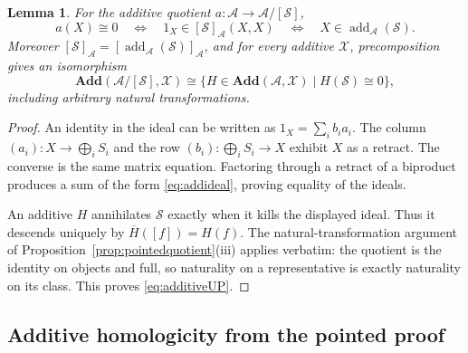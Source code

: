 \documentclass[11pt,reqno,a4paper]{amsart}
\newtheorem{lemma}[theorem]{Lemma}
\theoremstyle{definition}
\theoremstyle{remark}
\newcommand{\A}{\mathcal{A}}
\newcommand{\0}{\mathbf{0}}
\renewcommand{\1}{\mathbf{1}}
\newcommand{\iso}{\cong}
\newcommand{\Add}{\mathbf{Add}}
\newcommand{\Scl}{\mathcal S}
\newcommand{\X}{\mathcal X}
\newcommand{\aq}[2]{#1/[#2]}
\DeclareMathOperator{\add}{add}
\begin{document}
\begin{lemma}\label{lem:additivequotient}
For the additive quotient $a:\A\to\aq{\A}{\Scl}$,
\begin{equation}\label{eq:additivezero}
 a(X)\iso0\quad\Longleftrightarrow\quad
 1_X\in[\Scl]_{\A}(X,X)
 \quad\Longleftrightarrow\quad X\in\add_{\A}(\Scl).
\end{equation}
Moreover $[\Scl]_{\A}=[\add_{\A}(\Scl)]_{\A}$, and for every
additive $\X$, precomposition gives an isomorphism
\begin{equation}\label{eq:additiveUP}
 \Add(\aq{\A}{\Scl},\X)\iso
 \{H\in\Add(\A,\X)\mid H(\Scl)\iso0\},
\end{equation}
including arbitrary natural transformations.
\end{lemma}
\begin{proof}
An identity in the ideal can be written as $1_X=\sum_i b_i a_i$.
The column $(a_i):X\to\bigoplus_i S_i$ and the row
$(b_i):\bigoplus_i S_i\to X$ exhibit $X$ as a retract. The converse
is the same matrix equation. Factoring through a retract of a biproduct
produces a sum of the form \eqref{eq:addideal}, proving equality of the
ideals.

An additive $H$ annihilates $\Scl$ exactly when it kills the displayed
ideal. Thus it descends uniquely by $\overline H([f])=H(f)$.
The natural-transformation argument of
Proposition~\ref{prop:pointedquotient}(iii) applies verbatim: the quotient
is the identity on objects and full, so naturality on a representative
is exactly naturality on its class. This proves \eqref{eq:additiveUP}.
\end{proof}

\subsection{Additive homologicity from the pointed proof}
\end{document}
